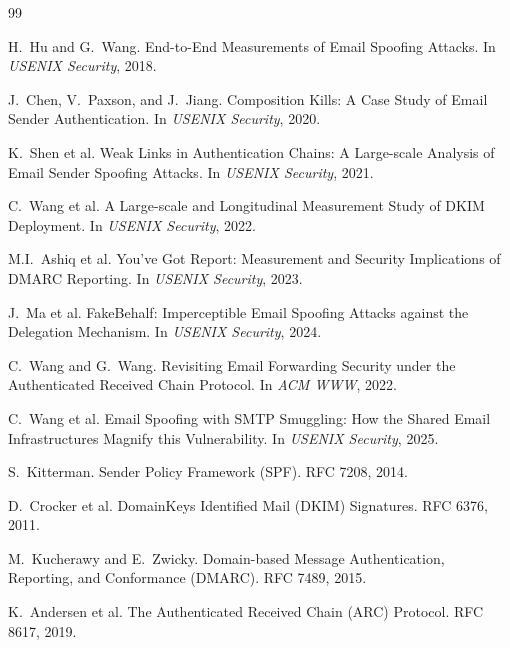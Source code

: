 \documentclass[11pt,a4paper]{article}
\begin{document}
\begin{thebibliography}{99}

H.~Hu and G.~Wang.
\newblock End-to-End Measurements of Email Spoofing Attacks.
\newblock In \emph{USENIX Security}, 2018.

J.~Chen, V.~Paxson, and J.~Jiang.
\newblock Composition Kills: A Case Study of Email Sender Authentication.
\newblock In \emph{USENIX Security}, 2020.

K.~Shen et al.
\newblock Weak Links in Authentication Chains: A Large-scale Analysis of Email Sender Spoofing Attacks.
\newblock In \emph{USENIX Security}, 2021.

C.~Wang et al.
\newblock A Large-scale and Longitudinal Measurement Study of DKIM Deployment.
\newblock In \emph{USENIX Security}, 2022.

M.I.~Ashiq et al.
\newblock You've Got Report: Measurement and Security Implications of DMARC Reporting.
\newblock In \emph{USENIX Security}, 2023.

J.~Ma et al.
\newblock FakeBehalf: Imperceptible Email Spoofing Attacks against the Delegation Mechanism.
\newblock In \emph{USENIX Security}, 2024.

C.~Wang and G.~Wang.
\newblock Revisiting Email Forwarding Security under the Authenticated Received Chain Protocol.
\newblock In \emph{ACM WWW}, 2022.

C.~Wang et al.
\newblock Email Spoofing with SMTP Smuggling: How the Shared Email Infrastructures Magnify this Vulnerability.
\newblock In \emph{USENIX Security}, 2025.

S.~Kitterman.
\newblock Sender Policy Framework (SPF).
\newblock RFC 7208, 2014.

D.~Crocker et al.
\newblock DomainKeys Identified Mail (DKIM) Signatures.
\newblock RFC 6376, 2011.

M.~Kucherawy and E.~Zwicky.
\newblock Domain-based Message Authentication, Reporting, and Conformance (DMARC).
\newblock RFC 7489, 2015.

K.~Andersen et al.
\newblock The Authenticated Received Chain (ARC) Protocol.
\newblock RFC 8617, 2019.

\end{thebibliography}
\end{document}
